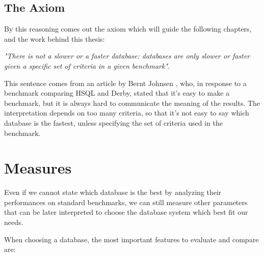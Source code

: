 		\subsection{The Axiom}
By this reasoning comes out the axiom which will guide the following chapters, and the work behind this thesis:

\label{axiom} \emph{"There is not a slower or a faster database: databases are only slower or faster given a specific set of criteria in a given benchmark"}.

This sentence comes from an article by Bernt Johnsen \cite{Bernt}, who, in response to a benchmark comparing HSQL and Derby, stated that it's easy to make a benchmark, but it is always hard to communicate the meaning of the results. The interpretation depends on too many criteria, so that it's not easy to say which database is the fastest, unless specifying the set of criteria used in the benchmark.
	
		\section{Measures}\label{measures}
Even if we cannot state which database is the best by analyzing their performances on standard benchmarks, we can still measure other parameters that can be later interpreted to choose the database system which best fit our needs.

When choosing a database, the most important features to evaluate and compare are:

